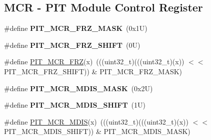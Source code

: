 \subsection*{M\+CR -\/ P\+IT Module Control Register}
\begin{DoxyCompactItemize}
\item 
\mbox{\label{group___p_i_t___register___masks_ga8149a0bb21843632dd4528b540480ba7}} 
\#define {\bfseries P\+I\+T\+\_\+\+M\+C\+R\+\_\+\+F\+R\+Z\+\_\+\+M\+A\+SK}~(0x1\+U)
\item 
\mbox{\label{group___p_i_t___register___masks_ga500ccd29eaebc20aa853e7bbb23e3c0c}} 
\#define {\bfseries P\+I\+T\+\_\+\+M\+C\+R\+\_\+\+F\+R\+Z\+\_\+\+S\+H\+I\+FT}~(0\+U)
\item 
\#define \mbox{\hyperlink{group___p_i_t___register___masks_gab52ff9f5a1c18eee41b58100aa415dfe}{P\+I\+T\+\_\+\+M\+C\+R\+\_\+\+F\+RZ}}(x)~(((uint32\+\_\+t)(((uint32\+\_\+t)(x)) $<$$<$ P\+I\+T\+\_\+\+M\+C\+R\+\_\+\+F\+R\+Z\+\_\+\+S\+H\+I\+FT)) \& P\+I\+T\+\_\+\+M\+C\+R\+\_\+\+F\+R\+Z\+\_\+\+M\+A\+SK)
\item 
\mbox{\label{group___p_i_t___register___masks_ga024258b2c23ff75f3e161e56adbbe733}} 
\#define {\bfseries P\+I\+T\+\_\+\+M\+C\+R\+\_\+\+M\+D\+I\+S\+\_\+\+M\+A\+SK}~(0x2\+U)
\item 
\mbox{\label{group___p_i_t___register___masks_ga7ddcd16550ff71e4ee5ac48022ae6fb6}} 
\#define {\bfseries P\+I\+T\+\_\+\+M\+C\+R\+\_\+\+M\+D\+I\+S\+\_\+\+S\+H\+I\+FT}~(1\+U)
\item 
\#define \mbox{\hyperlink{group___p_i_t___register___masks_gafae73f01b87a4e133c1289e0d09f8de2}{P\+I\+T\+\_\+\+M\+C\+R\+\_\+\+M\+D\+IS}}(x)~(((uint32\+\_\+t)(((uint32\+\_\+t)(x)) $<$$<$ P\+I\+T\+\_\+\+M\+C\+R\+\_\+\+M\+D\+I\+S\+\_\+\+S\+H\+I\+FT)) \& P\+I\+T\+\_\+\+M\+C\+R\+\_\+\+M\+D\+I\+S\+\_\+\+M\+A\+SK)
\end{DoxyCompactItemize}
